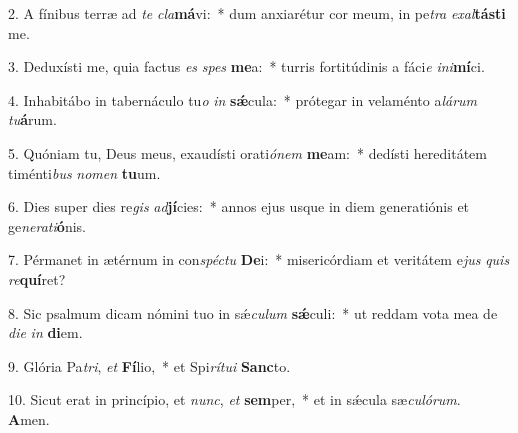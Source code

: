2. A fínibus terræ ad \textit{te} \textit{cla}\textbf{má}vi:~*  dum anxiarétur cor meum, in pe\textit{tra} \textit{ex}\textit{al}\textbf{tás}\textbf{ti} me.\

3. Deduxísti me, quia factus \textit{es} \textit{spes} \textbf{me}a:~*  turris fortitúdinis a fáci\textit{e} \textit{in}\textit{i}\textbf{mí}ci.\

4. Inhabitábo in tabernáculo tu\textit{o} \textit{in} \textbf{sǽ}cula:~*  prótegar in velaménto a\textit{lá}\textit{rum} \textit{tu}\textbf{á}rum.\

5. Quóniam tu, Deus meus, exaudísti orati\textit{ó}\textit{nem} \textbf{me}am:~*  dedísti hereditátem timénti\textit{bus} \textit{no}\textit{men} \textbf{tu}um.\

6. Dies super dies re\textit{gis} \textit{ad}\textbf{jí}cies:~*  annos ejus usque in diem generatiónis et ge\textit{ne}\textit{ra}\textit{ti}\textbf{ó}nis.\

7. Pérmanet in ætérnum in con\textit{spéc}\textit{tu} \textbf{De}i:~*  misericórdiam et veritátem e\textit{jus} \textit{quis} \textit{re}\textbf{quí}ret?\

8. Sic psalmum dicam nómini tuo in sǽ\textit{cu}\textit{lum} \textbf{sǽ}culi:~*  ut reddam vota mea de \textit{di}\textit{e} \textit{in} \textbf{di}em.\

9. Glória Pa\textit{tri}, \textit{et} \textbf{Fí}lio,~*  et Spi\textit{rí}\textit{tu}\textit{i} \textbf{Sanc}to.\

10. Sicut erat in princípio, et \textit{nunc}, \textit{et} \textbf{sem}per,~*  et in sǽcula sæ\textit{cu}\textit{ló}\textit{rum}. \textbf{A}men.\

